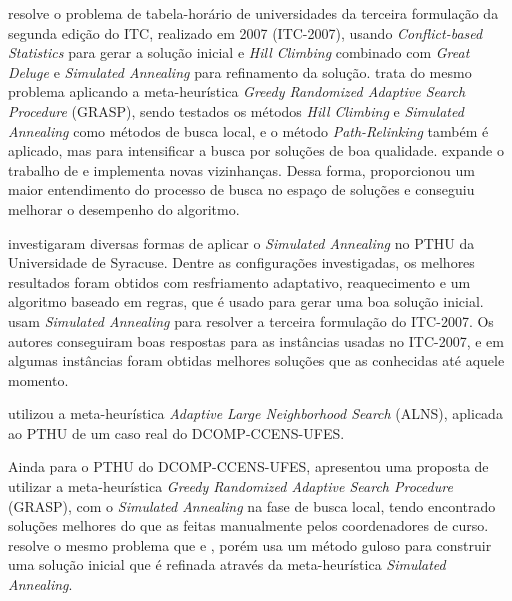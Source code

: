  resolve o problema de tabela-horário de universidades da terceira formulação da segunda edição do ITC, realizado em 2007 (ITC-2007), usando \textit{Conflict-based Statistics} para gerar a solução inicial e \textit{Hill Climbing} combinado com \textit{Great Deluge} e \textit{Simulated Annealing} para refinamento da solução.  trata do mesmo problema aplicando a meta-heurística \textit{Greedy Randomized Adaptive Search Procedure} (GRASP), sendo testados os métodos \textit{Hill Climbing} e \textit{Simulated Annealing} como métodos de busca local, e o método \textit{Path-Relinking} também é aplicado, mas para intensificar a busca por soluções de boa qualidade.  expande o trabalho de  e implementa novas vizinhanças. Dessa forma, proporcionou um maior entendimento do processo de busca no espaço de soluções e conseguiu melhorar o desempenho do algoritmo.

 investigaram diversas formas de aplicar o \textit{Simulated Annealing} no PTHU da Universidade de Syracuse. Dentre as configurações investigadas, os melhores resultados foram obtidos com resfriamento adaptativo, reaquecimento e um algoritmo baseado em regras, que é usado para gerar uma boa solução inicial.  usam \textit{Simulated Annealing} para resolver a terceira formulação do ITC-2007. Os autores conseguiram boas respostas para as instâncias usadas no ITC-2007, e em algumas instâncias foram obtidas melhores soluções que as conhecidas até aquele momento.

 utilizou a meta-heurística \textit{Adaptive Large Neighborhood Search} (ALNS), aplicada ao PTHU de um caso real do DCOMP-CCENS-UFES.

Ainda para o PTHU do DCOMP-CCENS-UFES,  apresentou uma proposta de utilizar a meta-heurística \textit{Greedy Randomized Adaptive Search Procedure} (GRASP), com o \textit{Simulated Annealing} na fase de busca local, tendo encontrado soluções melhores do que as feitas manualmente pelos coordenadores de curso.  resolve o mesmo problema que  e , porém usa um método guloso para construir uma solução inicial que é refinada através da meta-heurística \textit{Simulated Annealing}.